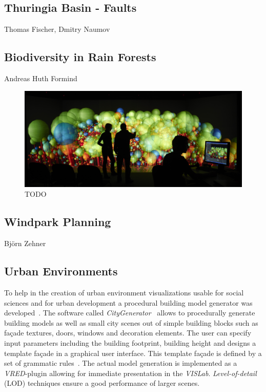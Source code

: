 \documentclass[twocolumn]{svjour3}          %
\begin{document}
\subsection{Thuringia Basin - Faults}
\label{thuringia-basin---faults}

Thomas Fischer, Dmitry Naumov

\subsection{Biodiversity in Rain Forests}
\label{biodiversity-in-rain-forests}

Andreas Huth Formind \cite{kohler:98}

\begin{figure}
  \includegraphics[width=\linewidth]{images/biodiversity.jpg}
\caption{TODO}
\label{fig:biodiversity}
\end{figure}

\subsection{Windpark Planning}
\label{windpark-planning}

Bj\"orn Zehner \cite{zehner:windpark}

\subsection{Urban Environments}
\label{urban-environments}


To help in the creation of urban environment visualizations usable for social sciences and for urban development a procedural building model generator was developed~\cite{bilke:master,procedural:modelling}. The software called \emph{CityGenerator}~\cite{bilke:citygenerator} allows to procedurally generate building models as well as small city scenes out of simple building blocks such as fa\c{c}ade textures, doors, windows and decoration elements. The user can specify input parameters including the building footprint, building height and designs a template fa\c{c}ade in a graphical user interface. This template fa\c{c}ade is defined by a set of grammatic rules~\cite{procedural:buildings}. The actual model generation is implemented as a \emph{VRED}-plugin allowing for immediate presentation in the \emph{VISLab}. \emph{Level-of-detail} (LOD) techniques ensure a good performance of larger scenes.
\end{document}
